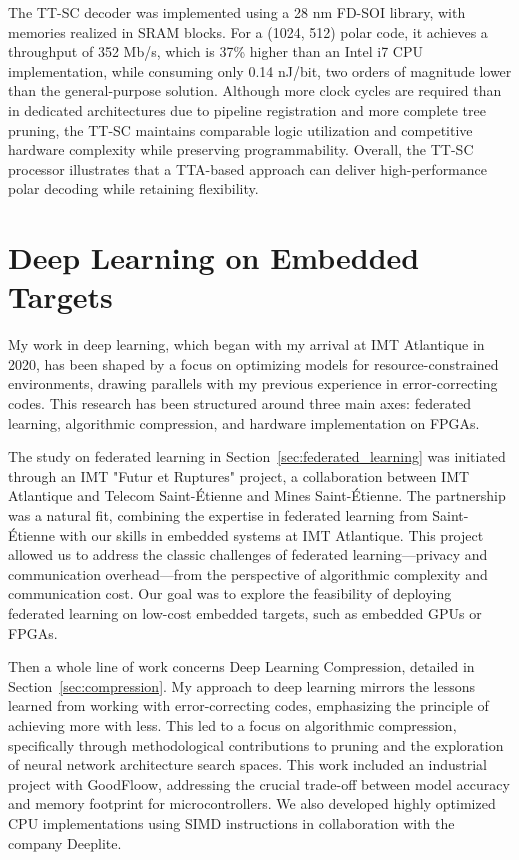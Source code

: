 \documentclass[11pt]{report}
\begin{document}
The TT-SC decoder was implemented using a 28 nm FD-SOI library, with memories realized in SRAM blocks. For a (1024, 512) polar code, it achieves a throughput of 352 Mb/s, which is 37\% higher than an Intel i7 CPU implementation, while consuming only 0.14 nJ/bit, two orders of magnitude lower than the general-purpose solution. Although more clock cycles are required than in dedicated architectures due to pipeline registration and more complete tree pruning, the TT-SC maintains comparable logic utilization and competitive hardware complexity while preserving programmability. Overall, the TT-SC processor illustrates that a TTA-based approach can deliver high-performance polar decoding while retaining flexibility.

\newpage


\chapter{Deep Learning on Embedded Targets}
\label{sec:deep_learning_embedded}


My work in deep learning, which began with my arrival at IMT Atlantique in 2020, has been shaped by a focus on optimizing models for resource-constrained environments, drawing parallels with my previous experience in error-correcting codes. This research has been structured around three main axes: federated learning, algorithmic compression, and hardware implementation on FPGAs.

The study on federated learning in Section~\ref{sec:federated_learning} was initiated through an IMT "Futur et Ruptures" project, a collaboration between IMT Atlantique and Telecom Saint-Étienne and Mines Saint-Étienne. The partnership was a natural fit, combining the expertise in federated learning from Saint-Étienne with our skills in embedded systems at IMT Atlantique. This project allowed us to address the classic challenges of federated learning—privacy and communication overhead—from the perspective of algorithmic complexity and communication cost. Our goal was to explore the feasibility of deploying federated learning on low-cost embedded targets, such as embedded GPUs or FPGAs.

Then a whole line of work concerns Deep Learning Compression, detailed in Section~\ref{sec:compression}. My approach to deep learning mirrors the lessons learned from working with error-correcting codes, emphasizing the principle of achieving more with less. This led to a focus on algorithmic compression, specifically through methodological contributions to pruning and the exploration of neural network architecture search spaces. This work included an industrial project with GoodFloow, addressing the crucial trade-off between model accuracy and memory footprint for microcontrollers. We also developed highly optimized CPU implementations using SIMD instructions in collaboration with the company Deeplite.
\end{document}
